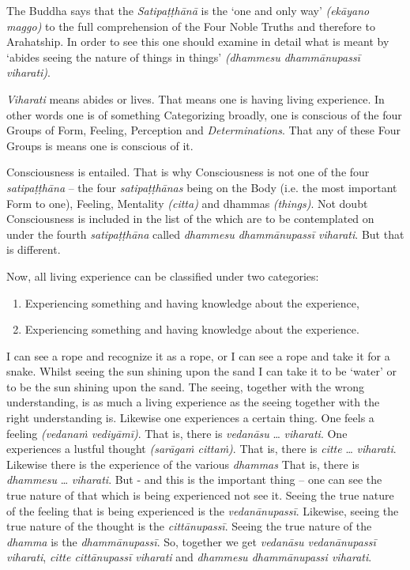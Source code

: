 The Buddha says that the \emph{Satipaṭṭhānā} is the `one and only way' \emph{(ekāyano maggo)} to the full comprehension of the Four Noble Truths and therefore to Arahatship. In order to see this one should examine in detail what is meant by `abides seeing the nature of things in things' \emph{(dhammesu dhammānupassī viharati)}.

\emph{Viharati} means abides or lives. That means one is having living experience. In other words one is  of something Categorizing broadly, one is conscious of the four Groups of Form, Feeling, Perception and \emph{Determinations}. That any of these Four Groups is  means one is conscious of it.

Consciousness is  entailed. That is why Consciousness is not one of the four \emph{satipaṭṭhāna} -- the four \emph{satipaṭṭhānas} being on the Body (i.e. the most important Form to one), Feeling, Mentality \emph{(citta)} and dhammas \emph{(things)}. Not doubt Consciousness is included in the list of the  which are to be contemplated on under the fourth \emph{satipaṭṭhāna} called \emph{dhammesu dhammānupassī viharati}. But that is different.

Now, all living experience can be classified under two categories:

\begin{enumerate}
\def\labelenumi{\arabic{enumi}.}
\item
  Experiencing something and having  knowledge about the experience,
\item
  Experiencing something and having  knowledge about the experience.
\end{enumerate}

I can see a rope and recognize it as a rope, or I can see a rope and take it for a snake. Whilst seeing the sun shining upon the sand I can take it to be `water' or to be the sun shining upon the sand. The seeing, together with the wrong understanding, is as much a living experience as the seeing together with the right understanding is. Likewise one experiences a certain thing. One feels a feeling \emph{(vedanaṁ vediyāmī)}. That is, there is \emph{vedanāsu} \ldots\hspace{0pt} \emph{viharati}. One experiences a lustful thought \emph{(sarāgaṁ cittaṁ)}. That is, there is \emph{citte} \ldots\hspace{0pt} \emph{viharati}. Likewise there is the experience of the various \emph{dhammas} That is, there is \emph{dhammesu} \ldots\hspace{0pt} \emph{viharati}. But - and this is the important thing -- one can see the true nature of that which is being experienced  not see it. Seeing the true nature of the feeling that is being experienced is the \emph{vedanānupassī}. Likewise, seeing the true nature of the thought is the \emph{cittānupassī}. Seeing the true nature of the \emph{dhamma} is the \emph{dhammānupassī}. So, together we get \emph{vedanāsu vedanānupassī viharati}, \emph{citte cittānupassī viharati} and \emph{dhammesu dhammānupassi viharati}.

